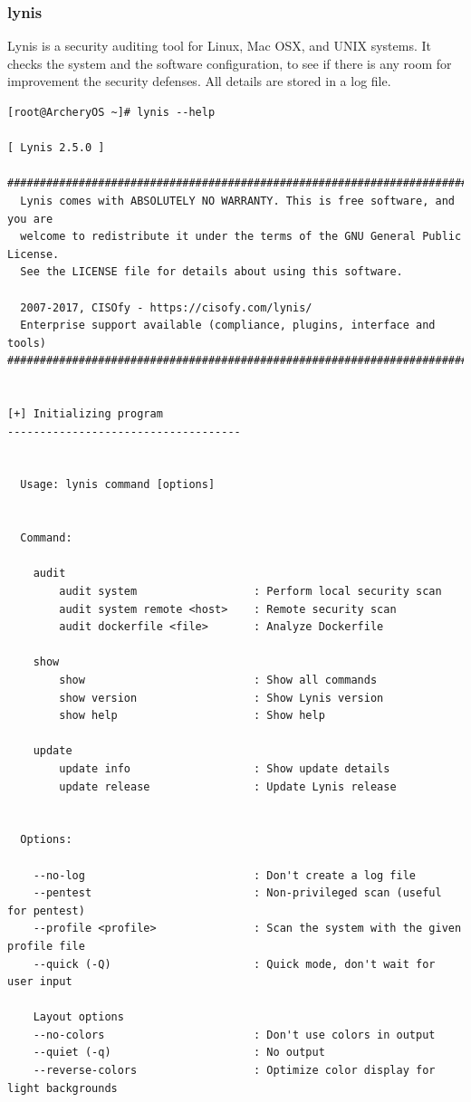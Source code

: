 \documentclass{article}
\begin{document}
\subsubsection{lynis}
Lynis is a security auditing tool for Linux, Mac OSX, and UNIX systems. It checks the system and the software configuration, to see if there is any  room for improvement the security defenses. All details are stored in a log file.
\begin{lstlisting}
[root@ArcheryOS ~]# lynis --help

[ Lynis 2.5.0 ]

################################################################################
  Lynis comes with ABSOLUTELY NO WARRANTY. This is free software, and you are
  welcome to redistribute it under the terms of the GNU General Public License.
  See the LICENSE file for details about using this software.

  2007-2017, CISOfy - https://cisofy.com/lynis/
  Enterprise support available (compliance, plugins, interface and tools)
################################################################################


[+] Initializing program
------------------------------------


  Usage: lynis command [options]


  Command:

    audit
        audit system                  : Perform local security scan
        audit system remote <host>    : Remote security scan
        audit dockerfile <file>       : Analyze Dockerfile

    show
        show                          : Show all commands
        show version                  : Show Lynis version
        show help                     : Show help

    update
        update info                   : Show update details
        update release                : Update Lynis release


  Options:

    --no-log                          : Don't create a log file
    --pentest                         : Non-privileged scan (useful for pentest)
    --profile <profile>               : Scan the system with the given profile file
    --quick (-Q)                      : Quick mode, don't wait for user input

    Layout options
    --no-colors                       : Don't use colors in output
    --quiet (-q)                      : No output
    --reverse-colors                  : Optimize color display for light backgrounds


\end{lstlisting}
\end{document}
